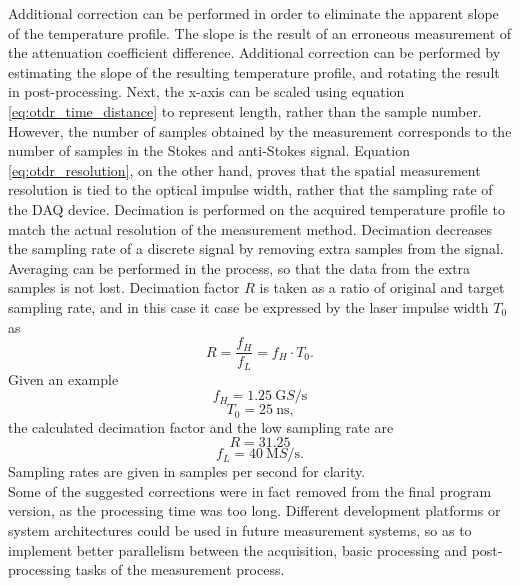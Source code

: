 \documentclass{standalone}
\begin{document}
Additional correction can be performed in order to eliminate the apparent slope of the temperature profile. The slope is the result of an erroneous measurement of the attenuation coefficient difference. Additional correction can be performed by estimating the slope of the resulting temperature profile, and rotating the result in post-processing. Next, the x-axis can be scaled using equation \ref{eq:otdr_time_distance} to represent length, rather than the sample number. However, the number of samples obtained by the measurement corresponds to the number of samples in the Stokes and anti-Stokes signal. Equation \ref{eq:otdr_resolution}, on the other hand, proves that the spatial measurement resolution is tied to the optical impulse width, rather that the sampling rate of the DAQ device. Decimation is performed on the acquired temperature profile to match the actual resolution of the measurement method. Decimation decreases the sampling rate of a discrete signal by removing extra samples from the signal. Averaging can be performed in the process, so that the data from the extra samples is not lost. Decimation factor $R$ is taken as a ratio of original and target sampling rate, and in this case it case be expressed by the laser impulse width $T_0$ as
\begin{equation}
R = \frac{f_H}{f_L} = f_H \cdot T_0 \textrm{.}
\end{equation}
Given an example
\begin{equation}
f_H = \SI{1.25}{\giga S / \second}
\end{equation}
\begin{equation}
T_0 = \SI{25}{\nano \second} \textrm{,}
\end{equation}
the calculated decimation factor and the low sampling rate are
\begin{equation}
R = 31.25
\end{equation}
\begin{equation}
f_L = \SI{40}{\mega S / \second} \textrm{.}
\end{equation}
Sampling rates are given in samples per second for clarity. \\

Some of the suggested corrections were in fact removed from the final program version, as the processing time was too long. Different development platforms or system architectures could be used in future measurement systems, so as to implement better parallelism between the acquisition, basic processing and post-processing tasks of the measurement process.


\setcounter{stranica}{\thepage}
\addtocounter{stranica}{1}
\end{document}
